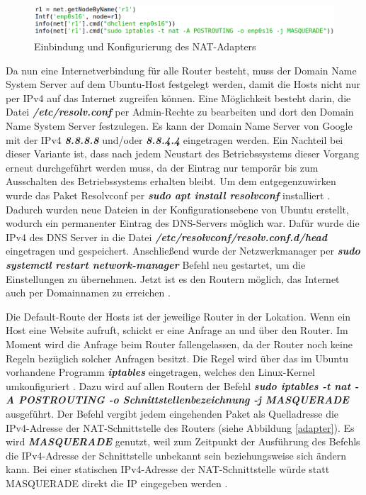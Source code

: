 \documentclass[fontsize=12pt,paper=a4,open=any,parskip=half,
  twoside=false,toc=listof,toc=bibliography,fleqn,leqno,
  captions=nooneline,captions=tableabove,british]{scrbook}
\begin{document}
\begin{figure}[H]
 \centering
 \includegraphics[width=1.0\textwidth]{Bilder/interface}
 \captionsetup{justification=centering,margin=2cm}
 \caption{Einbindung und Konfigurierung des NAT-Adapters}
 \label{interface}
\end{figure}

Da nun eine Internetverbindung für alle Router besteht, muss der Domain Name System Server auf dem Ubuntu-Host festgelegt werden, damit die Hosts nicht nur per IPv4 auf das Internet zugreifen können. Eine Möglichkeit besteht darin, die Datei \textit{\textbf{/etc/resolv.conf}} per Admin-Rechte zu bearbeiten und dort den Domain Name System Server festzulegen. Es kann der Domain Name Server von Google mit der IPv4 \textit{\textbf{8.8.8.8}} und/oder \textit{\textbf{8.8.4.4}} eingetragen werden. Ein Nachteil bei dieser Variante ist, dass nach jedem Neustart des Betriebssystems dieser Vorgang erneut durchgeführt werden muss, da der Eintrag nur temporär bis zum Ausschalten des Betriebssystems erhalten bleibt. Um dem entgegenzuwirken wurde das Paket Resolvconf per \textit{\textbf{sudo apt install resolvconf}} installiert \cite{resolvconf}. Dadurch wurden neue Dateien in der Konfigurationsebene von Ubuntu erstellt, wodurch ein permanenter Eintrag des DNS-Servers möglich war. Dafür wurde die IPv4 des DNS Server in die Datei \textit{\textbf{/etc/resolvconf/resolv.conf.d/head}} eingetragen und gespeichert. Anschließend wurde der Netzwerkmanager per \textit{\textbf{sudo systemctl restart network-manager}} Befehl neu gestartet, um die Einstellungen zu übernehmen. Jetzt ist es den Routern möglich, das Internet auch per Domainnamen zu erreichen \cite{nameservers}.

Die Default-Route der Hosts ist der jeweilige Router in der Lokation. Wenn ein Host eine Website aufruft, schickt er eine Anfrage an und über den Router. Im Moment wird die Anfrage beim Router fallengelassen, da der Router noch keine Regeln bezüglich solcher Anfragen besitzt. Die Regel wird über das im Ubuntu vorhandene Programm \textit{\textbf{iptables}} eingetragen, welches den Linux-Kernel umkonfiguriert \cite{iptables}. Dazu wird auf allen Routern der Befehl \textit{\textbf{sudo iptables -t nat -A POSTROUTING -o Schnittstellenbezeichnung -j MASQUERADE}} ausgeführt. Der Befehl vergibt jedem eingehenden Paket als Quelladresse die IPv4-Adresse der NAT-Schnittstelle des Routers \cite{iptablesmas} (siehe Abbildung \ref{adapter}). Es wird \textit{\textbf{MASQUERADE}} genutzt, weil zum Zeitpunkt der Ausführung des Befehls die IPv4-Adresse der Schnittstelle unbekannt sein beziehungsweise sich ändern kann. Bei einer statischen IPv4-Adresse der NAT-Schnittstelle würde statt MASQUERADE direkt die IP eingegeben werden \cite{iptablesnat}.
\newpage
\end{document}
